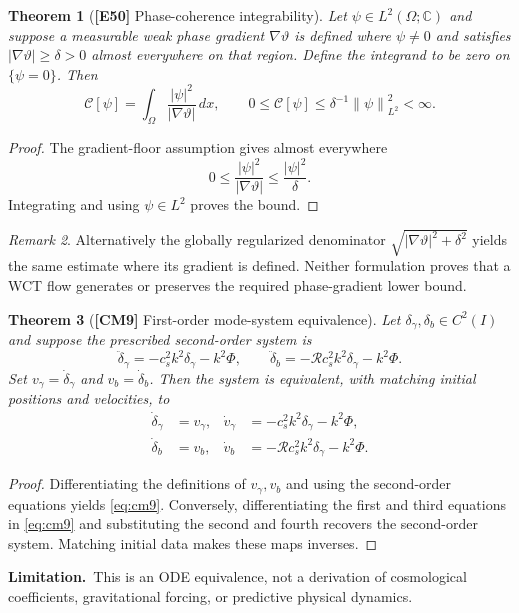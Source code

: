 \documentclass[11pt,letterpaper]{article}
\newtheorem{theorem}{Theorem}[section]
\theoremstyle{definition}
\theoremstyle{remark}
\newtheorem{remark}[theorem]{Remark}
\newcommand{\C}{\mathbb C}
\newcommand{\norm}[1]{\left\lVert#1\right\rVert}
\newcommand{\abs}[1]{\left\lvert#1\right\rvert}
\newcommand{\id}[1]{\textnormal{\textbf{[#1]}}}
\newcommand{\scope}{\par\smallskip\noindent\textbf{Limitation.}\ }
\begin{document}
\begin{theorem}[\id{E50} Phase-coherence integrability]\label{thm:coherence}
Let $\psi\in L^2(\Omega;\C)$ and suppose a measurable weak phase
gradient $\nabla\vartheta$ is defined where $\psi\ne0$ and satisfies
$\abs{\nabla\vartheta}\ge\delta>0$ almost everywhere on that region.
Define the integrand to be zero on $\{\psi=0\}$. Then
\begin{equation}\label{eq:coherence}
\mathcal C[\psi]=\int_\Omega\frac{\abs\psi^2}{\abs{\nabla\vartheta}}\,dx,
\qquad
\boxed{0\le\mathcal C[\psi]\le\delta^{-1}\norm\psi_{L^2}^2<\infty}.
\end{equation}
\end{theorem}
\begin{proof}
The gradient-floor assumption gives almost everywhere
\begin{equation*}
0\le\frac{\abs\psi^2}{\abs{\nabla\vartheta}}
\le\frac{\abs\psi^2}{\delta}.
\end{equation*}
Integrating and using $\psi\in L^2$ proves the bound.
\end{proof}
\begin{remark}
Alternatively the globally regularized denominator
$\sqrt{\abs{\nabla\vartheta}^2+\delta^2}$ yields the same estimate
where its gradient is defined. Neither formulation proves that a WCT
flow generates or preserves the required phase-gradient lower bound.
\end{remark}

\begin{theorem}[\id{CM9} First-order mode-system equivalence]\label{thm:firstorder}
Let $\delta_\gamma,\delta_b\in C^2(I)$ and suppose the prescribed
second-order system is
\begin{equation*}
\ddot\delta_\gamma=-c_s^2k^2\delta_\gamma-k^2\Phi,
\qquad
\ddot\delta_b=-\mathcal R c_s^2k^2\delta_\gamma-k^2\Phi.
\end{equation*}
Set $v_\gamma=\dot\delta_\gamma$ and $v_b=\dot\delta_b$.
Then the system is equivalent, with matching initial positions and
velocities, to
\begin{equation}\label{eq:cm9}
\boxed{\begin{aligned}
\dot\delta_\gamma&=v_\gamma,&
\dot v_\gamma&=-c_s^2k^2\delta_\gamma-k^2\Phi,\\
\dot\delta_b&=v_b,&
\dot v_b&=-\mathcal R c_s^2k^2\delta_\gamma-k^2\Phi.
\end{aligned}}
\end{equation}
\end{theorem}
\begin{proof}
Differentiating the definitions of $v_\gamma,v_b$ and using the
second-order equations yields \eqref{eq:cm9}. Conversely,
differentiating the first and third equations in \eqref{eq:cm9} and
substituting the second and fourth recovers the second-order system.
Matching initial data makes these maps inverses.
\end{proof}
\scope This is an ODE equivalence, not a derivation of cosmological
coefficients, gravitational forcing, or predictive physical dynamics.
\end{document}
